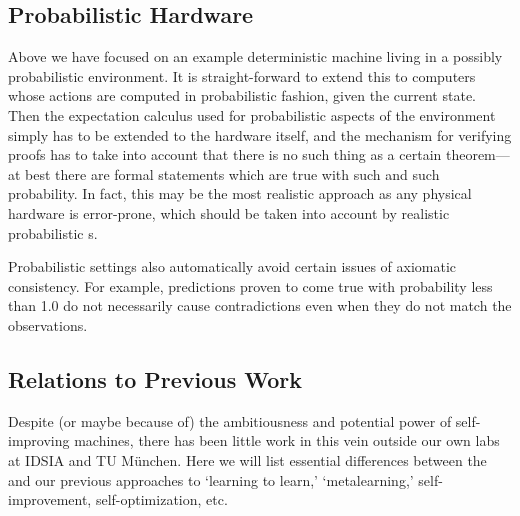\subsection{Probabilistic \GM Hardware}
\label{prob}
Above we have focused on an example deterministic machine
living in a possibly probabilistic environment.
It is straight-forward to extend this
to computers whose actions are computed in
probabilistic fashion, given the current state.
Then the expectation calculus
used for probabilistic aspects of the environment
simply has to be extended to the hardware itself,
and the mechanism for verifying proofs has to
take into account that there is no such thing as
a certain theorem---at best there are formal statements
which are true with such and such probability.
In fact, this may be the most realistic approach
as any physical hardware is error-prone,
which should be taken into account by
realistic probabilistic \gmn s.
 
 Probabilistic settings also automatically avoid certain
 issues of axiomatic consistency. For example, predictions
 proven to come true with
 probability less than 1.0 do not necessarily cause contradictions
 even when they do not match the observations.


\subsection{Relations to Previous Work}
\label{previous}
 
Despite (or maybe because of) the ambitiousness and
potential power of self-improving machines,
there has been little work in this vein outside our own
labs at IDSIA and TU M\"{u}nchen.
Here we will list essential differences
between the \gm and our previous approaches to `learning to learn,'
`metalearning,' self-improvement, self-optimization,  etc.

